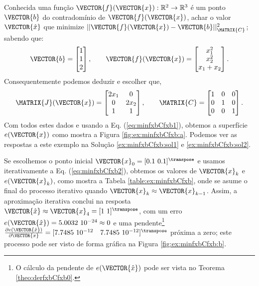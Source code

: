 \begin{example}
\label{ex:minfxbCfxb}
Conhecida uma função $\VECTOR{f}(\VECTOR{x}) : \mathbb{R}^{2} \rightarrow \mathbb{R}^{3}$
é um ponto $\VECTOR{b}$ do contradomínio de $\VECTOR{f}(\VECTOR{x})$,
achar o valor $\VECTOR{\hat{x}}$ que minimize $||\VECTOR{f}(\VECTOR{x})-\VECTOR{b}||_{\MATRIX{C}}^2$;
sabendo que:
\begin{equation}
\VECTOR{b}=\begin{bmatrix}
1\\
1\\
2
\end{bmatrix},
\qquad 
\VECTOR{f}(\VECTOR{x})=\begin{bmatrix}
x_1^2\\
x_2^2\\
x_1+x_2
\end{bmatrix}.
\end{equation}
Consequentemente podemos deduzir e escolher que, 
\begin{equation}\label{eq:lab:ex2fx}
\MATRIX{J}(\VECTOR{x})=\begin{bmatrix}
2 x_1 & 0\\
0 & 2 x_2\\
1 & 1
\end{bmatrix},
\qquad
\MATRIX{C}=\begin{bmatrix}
1 & 0 & 0\\
0 & 1 & 0\\
0 & 0 & 1
\end{bmatrix}.
\end{equation}
Com todos estes dados e usando a Eq. (\ref{eq:minfxbCfxb1}),
obtemos a superfície $e(\VECTOR{x})$ como mostra a Figura \ref{fig:ex:minfxbCfxb:a}.
Podemos ver as respostas a este exemplo na Solução \ref{ex:minfxbCfxb:sol1} e \ref{ex:minfxbCfxb:sol2}.
\end{example}

\begin{SolutionT}
\label{ex:minfxbCfxb:sol1}
Se escolhemos o ponto inicial $\VECTOR{x}_0=[0.1~0.1]^{\transpose}$ e 
usamos iterativamente a Eq. (\ref{eq:minfxbCfxb2}), obtemos os valores 
de $\VECTOR{x}_k$ e $e(\VECTOR{x}_k)$, como mostra a Tabela \ref{table:ex:minfxbCfxb},
onde se asume o final do processo iterativo quando $\VECTOR{x}_k \approx \VECTOR{x}_{k-1}$.
Assim, a aproximação iterativa conclui na resposta $\VECTOR{\hat{x}}\approx \VECTOR{x}_{4} =[1~1]^{\transpose}$,
com um erro $e(\VECTOR{\hat{x}})=5.0032~10^{-24}\approx 0$ e uma pendente\footnote{\label{ref:pendenteex} O
cálculo da pendente de $e(\VECTOR{\hat{x}})$ pode ser vista no Teorema \ref{theo:derfxbCfxb0}.}
$\frac{\partial e(\VECTOR{\hat{x}})}{\partial \VECTOR{x} }=[7.7485~10^{-12}\quad 7.7485~10^{-12}]^{\transpose}$
próxima a zero;
este processo pode ser visto de forma gráfica na Figura \ref{fig:ex:minfxbCfxb:b}.
\end{SolutionT}


